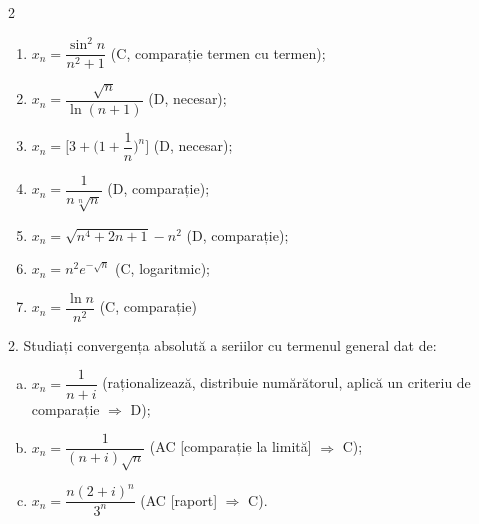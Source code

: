 \begin{multicols}{2}
\begin{enumerate}[(1)]
  \item $ x_n = \dfrac{\sin^2 n}{n^2 + 1} $ (C, comparație termen cu termen);
  \item $ x_n = \dfrac{\sqrt{n}}{\ln(n+1)} $ (D, necesar);
  \item $ x_n = \Big[ 3 + \Big( 1 + \dfrac{1}{n} \Big)^n \Big] $ (D, necesar);
  \item $ x_n = \dfrac{1}{n \sqrt[n]{n}} $ (D, comparație);
  \item $ x_n = \sqrt{n^4 + 2n + 1} - n^2 $ (D, comparație);
  \item $ x_n = n^2 e^{-\sqrt{n}} $ (C, logaritmic);
  \item $ x_n = \dfrac{\ln n}{n^2} $ (C, comparație)
  \end{enumerate}
\end{multicols}

\vspace{1cm}

2. Studiați convergența absolută a seriilor cu termenul general dat de:
\begin{enumerate}[(a)]
\item $ x_n = \dfrac{1}{n+i} $ (raționalizează, distribuie numărătorul, aplică %
  un criteriu de comparație $ \Rightarrow $ D);
\item $ x_n = \dfrac{1}{(n + i)\sqrt{n}} $ (AC [comparație la limită] $ \Rightarrow $ C);
\item $ x_n = \dfrac{n(2 + i)^n}{3^n} $ (AC [raport] $ \Rightarrow $ C).
\end{enumerate}


